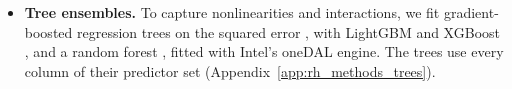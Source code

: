 \begin{itemize}
  predictors, and the intercept is not penalized. On the HAR set alone the selected penalties, \rhdmPlPenRidgeBase{}
  (ridge), \rhdmPlPenLassoBase{} (lasso) and \rhdmPlPenEnetBase{} (elastic net), are negligible, and the three
  forecasts coincide with the benchmark. Estimators, column screens and solvers: Appendix~\ref{app:rh_methods_linear}.
\item \textbf{Tree ensembles.} To capture nonlinearities and interactions, we fit gradient-boosted regression trees on
  the squared error \citep{Friedman2001}, with LightGBM \citep{Ke2017} and XGBoost \citep{Chen2016}, and a random
  forest \citep{Breiman2001}, fitted with Intel's oneDAL engine. The trees use every column of their predictor set
  (Appendix~\ref{app:rh_methods_trees}).
\end{itemize}

